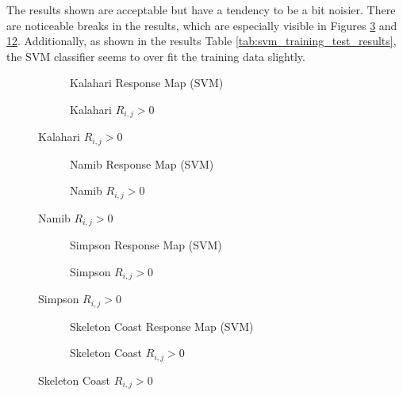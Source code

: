 The results shown are acceptable but have a tendency to be a bit noisier. There are noticeable breaks in the results, which are especially visible in Figures \ref{fig:kalahari_SVM_response_overlay} and \ref{fig:SkeletonCoast_SVM_response_overlay}. Additionally, as shown in the results Table \ref{tab:svm_training_test_results}, the SVM classifier seems to over fit the training data slightly. 
\begin{figure}[H]
	\centering
	\begin{subfigure}{0.48\textwidth}
		\centering
		\caption{Kalahari Response Map (SVM)}
		\label{fig:kalahari_SVM_response}
	\end{subfigure}
	\begin{subfigure}{0.48\textwidth}
		\centering
		\caption{ Kalahari $R_{i,j} > 0$}
		\label{fig:kalahari_SVM_response_overlay}
	\end{subfigure}
\end{figure}
\begin{figure}[H]
	\ContinuedFloat
	\centering
	\begin{subfigure}{0.48\textwidth}
		\centering
		\caption{Namib Response Map (SVM)}
		\label{fig:namib_SVM_response}
	\end{subfigure}
	\begin{subfigure}{0.48\textwidth}
		\centering
		\caption{ Namib $R_{i,j} > 0$}
		\label{fig:namib_SVM_response_overlay}
	\end{subfigure}
\end{figure}
\begin{figure}[H]
	\ContinuedFloat
	\centering
	\begin{subfigure}{0.48\textwidth}
		\centering
		\caption{Simpson Response Map (SVM)}
		\label{fig:simpson_SVM_response}
	\end{subfigure}
	\begin{subfigure}{0.48\textwidth}
		\centering
		\caption{ Simpson $R_{i,j} > 0$}
		\label{fig:simpson_SVM_response_overlay}
	\end{subfigure}
\end{figure}
\begin{figure}[H]
	\ContinuedFloat
	\centering
	\begin{subfigure}{0.48\textwidth}
		\centering
		\caption{Skeleton Coast Response Map (SVM)}
		\label{fig:SkeletonCoast_SVM_response}
	\end{subfigure}
	\begin{subfigure}{0.48\textwidth}
		\centering
		\caption{ Skeleton Coast $R_{i,j} > 0$}
		\label{fig:SkeletonCoast_SVM_response_overlay}
	\end{subfigure}
\end{figure}
